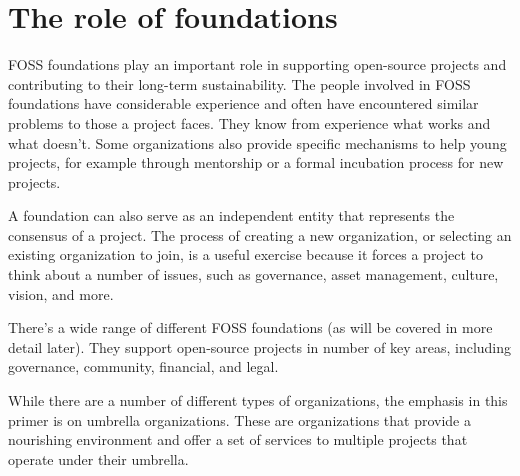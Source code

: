 


\chapter{The role of foundations}

FOSS foundations play an important role in supporting open-source projects and contributing to their long-term sustainability.  The people involved in FOSS foundations have considerable experience and often have encountered similar problems to those a project faces.  They know from experience what works and what doesn't.  Some organizations also provide specific mechanisms to help young projects, for example through mentorship or a formal incubation process for new projects.

A foundation can also serve as an independent entity that represents the consensus of a project.  The process of creating a new organization, or selecting an existing organization to join, is a useful exercise because it forces a project to think about a number of issues, such as governance, asset management, culture, vision, and more.

There's a wide range of different FOSS foundations (as will be covered in more detail later).  They support open-source projects in number of key areas, including governance, community, financial, and legal.

While there are a number of different types of organizations, the emphasis in this primer is on umbrella organizations.  These are organizations that provide a nourishing environment and offer a set of services to multiple projects that operate under their umbrella.

